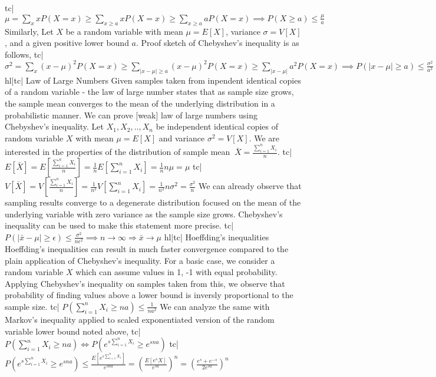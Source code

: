 tc| \( \mu = \sum_x xP(X=x) \ge \sum_{x\ge a}xP(X=x) \ge \sum_{x\ge a} aP(X=x) \implies P(X\ge a) \le \frac{\mu}{a} \)
Similarly, Let \(X\) be a random variable with mean \(\mu=E[X]\), variance \(\sigma=V[X]\), and a given positive lower bound \(a\). Proof sketch of Chebyshev's inequality is as follows,
tc| \( \sigma^2 = \sum_x (x - \mu)^2 P(X=x) \ge \sum_{|x-\mu| \ge a} (x - \mu)^2 P(X=x) \ge \sum_{|x-\mu|} a^2 P(X=x) \implies P(|x - \mu| \ge a) \le \frac{\sigma^2}{a^2} \)
hl|tc| Law of Large Numbers
Given samples taken from inpendent identical copies of a random variable - the law of large number states that as sample size grows, the sample mean converges to the mean of the underlying distribution in a probabilistic manner. We can prove [weak] law of large numbers using Chebyshev's inequality.
Let \(X_1,X_2,..,X_n\) be independent identical copies of random variable \(X\) with mean \(\mu=E[X]\) and variance \(\sigma^2=V[X]\). We are interested in the properties of the distribution of sample mean \(\ \bar{X} = \frac{\sum_{i=1}^n X_i}{n} \).
tc| \( E[\bar{X}] = E \left[\frac{\sum_{i=1}^nX_i}{n} \right] = \frac{1}{n} E\left[\sum_{i=1}^n X_i \right] = \frac{1}{n} n\mu = \mu \)
tc| \( V[\bar{X}] = V\left[\frac{ \sum_{i=1}^n X_i}{n} \right] = \frac{1}{n^2} V\left[\sum_{i=1}^n X_i \right] = \frac{1}{n^2} n\sigma^2 = \frac{\sigma^2}{n} \)
We can already observe that sampling results converge to a degenerate distribution focused on the mean of the underlying variable with zero variance as the sample size grows. Chebyshev's inequality can be used to make this statement more precise.
tc| \( P(|\bar{x} -\mu| \ge \epsilon) \le \frac{\sigma^2}{n\epsilon^2} \implies n \rightarrow \infty \Rightarrow \bar{x} \rightarrow \mu \)
hl|tc| Hoeffding's inequalities
Hoeffding's inequalities can result in much faster convergence compared to the plain application of Chebyshev's inequality. For a basic case, we consider a random variable \(X\) which can assume values in {1, -1} with equal probability. Applying Chebyshev's inequality on samples taken from this, we observe that probability of finding values above a lower bound is inversly proportional to the sample size.
tc| \( P(\sum_{i=1}^n X_i \ge na) \le \frac{1}{na^2} \)
We can analyze the same with Markov's inequality applied to scaled exponentiated version of the random variable lower bound noted above,
tc| \( P(\sum_{i=1}^n X_i \ge na) \iff P\left(e^{s\sum_{i=1}^nX_i} \ge e^{sna}\right) \)
tc| \( P\left(e^{s\sum_{i=1}^n X_i} \ge e^{sna} \right) \le \frac{E\left[e^{s\sum_{i=1}^n X_i}\right]}{e^{sna}} = \left(\frac{E\left[ e^sX \right]}{e^{sa}} \right)^n = \left( \frac{e^s + e^{-s}}{2e^{sa}} \right)^n \)
